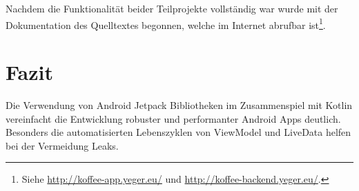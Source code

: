 \documentclass[a4paper, 11pt]{article}
\begin{document}
Nachdem die Funktionalität beider Teilprojekte vollständig war wurde mit der Dokumentation des Quelltextes begonnen, welche im Internet abrufbar ist\footnote{Siehe \url{http://koffee-app.yeger.eu/} und \url{http://koffee-backend.yeger.eu/}.}.

\section{Fazit}
\label{sec:conclusion}
Die Verwendung von Android Jetpack Bibliotheken im Zusammenspiel mit Kotlin vereinfacht die Entwicklung robuster und performanter Android Apps deutlich.
Besonders die automatisierten Lebenszyklen von ViewModel und LiveData helfen bei der Vermeidung Leaks.

\newpage
\begingroup
\raggedright
\printbibliography[title={Referenzen}, keyword=citations]
\nocite{*}
\newrefcontext[sorting=nty]
\printbibliography[title={Dokumentation}, keyword=sources, env=sources]
\endgroup
\end{document}
